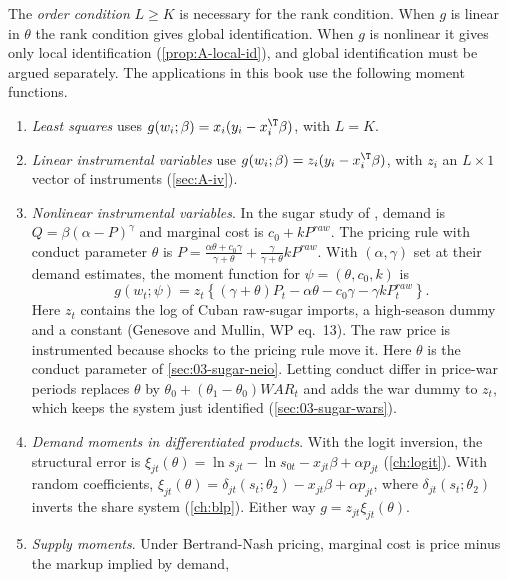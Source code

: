 The \emph{order condition} $L \ge K$ is necessary for the rank condition. When $g$ is linear in $\theta$ the rank condition
gives global identification. When $g$ is nonlinear it gives only local identification (\cref{prop:A-local-id}), and
global identification must be argued separately. The applications in this book use the following moment functions.
\begin{enumerate}
  \item \emph{Least squares} uses $g(w_i;\beta) = x_i(y_i - x_i^\T\beta)$, with $L = K$.
  \item \emph{Linear instrumental variables} use $g(w_i;\beta) = z_i(y_i - x_i^\T\beta)$, with $z_i$ an $L \times 1$
  vector of instruments (\cref{sec:A-iv}).
  \item \emph{Nonlinear instrumental variables}. In the sugar study of \citet{GenesoveMullin1998}, demand is
  $Q = \beta(\alpha - P)^\gamma$ and marginal cost is $c_0 + kP^{\mathit{raw}}$. The pricing rule with conduct parameter
  $\theta$ is $P = \frac{\alpha\theta + c_0\gamma}{\gamma + \theta} + \frac{\gamma}{\gamma + \theta}kP^{\mathit{raw}}$. With
  $(\alpha, \gamma)$ set at their demand estimates, the moment function for $\psi = (\theta, c_0, k)$ is
  \begin{equation}\label{eq:A-sugar-moment}
    g(w_t;\psi) = z_t\left\{(\gamma + \theta)P_t - \alpha\theta - c_0\gamma - \gamma kP^{\mathit{raw}}_t\right\}.
  \end{equation}
  Here $z_t$ contains the log of Cuban raw-sugar imports, a high-season dummy and a constant (Genesove and Mullin, WP
  eq.~13). The raw price is instrumented because shocks to the pricing rule move it. Here $\theta$ is the conduct
  parameter of \cref{sec:03-sugar-neio}. Letting conduct differ in price-war periods replaces $\theta$ by
  $\theta_0 + (\theta_1 - \theta_0)\mathit{WAR}_t$ and adds the war dummy to $z_t$, which keeps the system just
  identified (\cref{sec:03-sugar-wars}).
  \item \emph{Demand moments in differentiated products}. With the logit inversion, the structural error is
  $\xi_{jt}(\theta) = \ln s_{jt} - \ln s_{0t} - x_{jt}\beta + \alpha p_{jt}$ (\cref{ch:logit}). With random coefficients,
  $\xi_{jt}(\theta) = \delta_{jt}(s_t;\theta_2) - x_{jt}\beta + \alpha p_{jt}$, where $\delta_{jt}(s_t;\theta_2)$ inverts
  the share system (\cref{ch:blp}). Either way $g = z_{jt}\xi_{jt}(\theta)$.
  \item \emph{Supply moments}. Under Bertrand-Nash pricing, marginal cost is price minus the markup implied by demand,

\end{enumerate}
